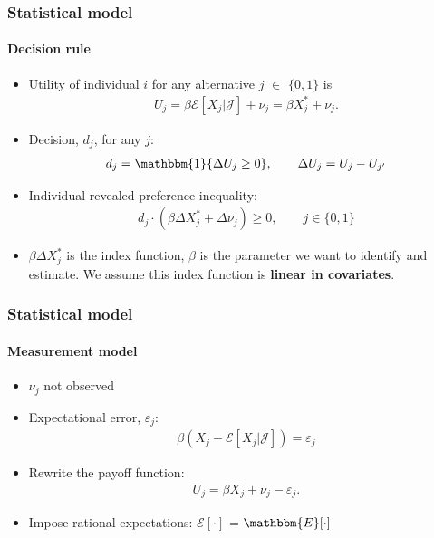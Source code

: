 \documentclass[10pt,letterpaper]{beamer}
\begin{document}
\begin{frame}
\frametitle{Statistical model} \framesubtitle{Decision rule}

\begin{itemize}
\item Utility of individual $i$ for any alternative $j$ $\in$ $\{0,1\}$ is  
\begin{align*}
U_{j}=\beta\mathcal{E}[X_{j}|\mathcal{J}]+\nu_{j}=\beta X^{*}_{j} + \nu_{j}.
\end{align*}

\item Decision, $d_{j}$, for any $j$:  
\begin{align*}
d_{j} = \mathbbm{1}\{\Delta U_{j}\geq 0\},\qquad\Delta U_{j} =
U_{j}-U_{j^{\prime }}
\end{align*}

\item Individual revealed preference inequality:  
\begin{align*}
d_{j} \cdot (\beta\Delta X^{*}_{j}+\Delta\nu_{j})\geq 0, \qquad j \in \{0,1\}
\end{align*}

\item $\beta\Delta X^{*}_{j}$ is the index function, $\beta$ is the
parameter we want to identify and estimate. We assume this index function is 
\textbf{linear in covariates}.
\end{itemize}
\end{frame}


\begin{frame}
\frametitle{Statistical model} \framesubtitle{Measurement model}

\begin{itemize}
\item $\nu_{j}$ not observed 

\item Expectational error, $\varepsilon_{j}$:  
\begin{align*}
\beta(X_{j} - \mathcal{E}[X_{j}|\mathcal{J}] )= \varepsilon_{j}
\end{align*}

\item Rewrite the payoff function:  
\begin{align*}
U_{j} = \beta X_{j}+\nu_{j}-\varepsilon_{j}.
\end{align*}

\item Impose rational expectations: $\mathcal{E}[\cdot]$ = $%
\mathbbm{E}[\cdot]$
\end{itemize}
\end{frame}
\end{document}
